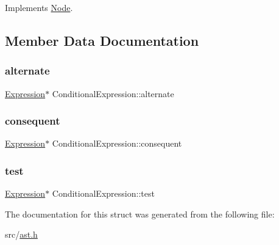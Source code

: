 Implements \hyperlink{struct_node_a82f29420d0a38efcc370352528e94e9b}{Node}.



\subsection{Member Data Documentation}
\mbox{\label{struct_conditional_expression_aed7b09dab98000c8542d6353eefd8dac}} 
\subsubsection{\texorpdfstring{alternate}{alternate}}
{\footnotesize\ttfamily \hyperlink{struct_expression}{Expression}$\ast$ Conditional\+Expression\+::alternate}

\mbox{\label{struct_conditional_expression_ac129a280df90c129183ec955f4e50ed0}} 
\subsubsection{\texorpdfstring{consequent}{consequent}}
{\footnotesize\ttfamily \hyperlink{struct_expression}{Expression}$\ast$ Conditional\+Expression\+::consequent}

\mbox{\label{struct_conditional_expression_a7bfe134769078a10eecccabba7405cc2}} 
\subsubsection{\texorpdfstring{test}{test}}
{\footnotesize\ttfamily \hyperlink{struct_expression}{Expression}$\ast$ Conditional\+Expression\+::test}



The documentation for this struct was generated from the following file\+:\begin{DoxyCompactItemize}
\item 
src/\hyperlink{ast_8h}{ast.\+h}\end{DoxyCompactItemize}
